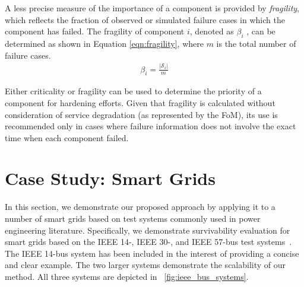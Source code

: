 \documentclass[review]{elsarticle}
\begin{document}
A less precise measure of the importance of a component is provided by \emph{fragility}, which reflects the fraction of observed or simulated failure cases in which the component has failed. The fragility of component $i$, denoted as $\beta_i$ , can be determined as shown in Equation \eqref{eqn:fragility}, where $m$ is the total number of failure cases.
\begin{eqnarray}
\label{eqn:fragility}
\beta_i = \frac{|\mathcal{S}_i|}{m}
\end{eqnarray}

Either criticality or fragility can be used to determine the priority of a component for hardening efforts. Given that fragility is calculated without consideration of service degradation (as represented by the FoM), its use is recommended only in cases where failure information does not involve the exact time when each component failed.

\section{Case Study: Smart Grids}
\label{sec:case_study}
In this section, we demonstrate our proposed approach by applying it to a number of smart grids based on test systems commonly used in power engineering literature. Specifically, we demonstrate survivability evaluation for smart grids based on the IEEE 14-, IEEE 30-, and IEEE 57-bus test systems~\cite{PSTCA}. The IEEE 14-bus system has been included in the interest of providing a concise and clear example. The two larger systems demonstrate the scalability of our method. All three systems are depicted in \figurename~\ref{fig:ieee_bus_systems}.
\end{document}
